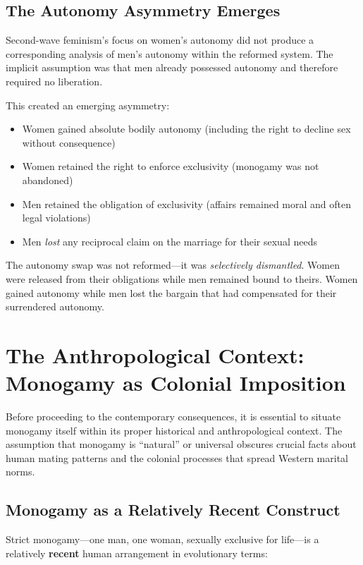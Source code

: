 \documentclass[12pt,openany]{book}
\numberwithin{equation}{chapter}
\begin{document}
\subsection{The Autonomy Asymmetry Emerges}

Second-wave feminism's focus on women's autonomy did not produce a corresponding analysis of men's autonomy within the reformed system. The implicit assumption was that men already possessed autonomy and therefore required no liberation.

This created an emerging asymmetry:

\begin{itemize}
    \item Women gained absolute bodily autonomy (including the right to decline sex without consequence)
    \item Women retained the right to enforce exclusivity (monogamy was not abandoned)
    \item Men retained the obligation of exclusivity (affairs remained moral and often legal violations)
    \item Men \textit{lost} any reciprocal claim on the marriage for their sexual needs
\end{itemize}

The autonomy swap was not reformed---it was \textit{selectively dismantled}. Women were released from their obligations while men remained bound to theirs. Women gained autonomy while men lost the bargain that had compensated for their surrendered autonomy.

\section{The Anthropological Context: Monogamy as Colonial Imposition}

Before proceeding to the contemporary consequences, it is essential to situate monogamy itself within its proper historical and anthropological context. The assumption that monogamy is ``natural'' or universal obscures crucial facts about human mating patterns and the colonial processes that spread Western marital norms.

\subsection{Monogamy as a Relatively Recent Construct}

Strict monogamy---one man, one woman, sexually exclusive for life---is a relatively \textbf{recent} human arrangement in evolutionary terms:
\end{document}
